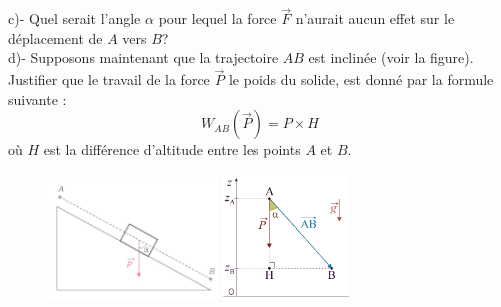 \documentclass[10pt]{beamer}
\begin{document}
\begin{frame}
\begin{block}{ }
c)- Quel serait l'angle $\alpha$ pour lequel la force $\overrightarrow{F}$ n'aurait aucun effet sur le déplacement de $A$ vers $B$? \\
d)- Supposons maintenant que la trajectoire $AB$ est inclinée (voir la figure). Justifier que le travail de la force $\overrightarrow{P}$ le poids du solide, est donné par la formule suivante :\\
\begin{equation*}
    W_{AB}(\overrightarrow{P}) = P\times H
\end{equation*} 
où $H$ est la différence d'altitude entre les points $A$ et $B$.
\end{block}
\begin{figure}[h]
\centering
\includegraphics[width=0.4\textwidth]{figure3.jpg}
\includegraphics[width=0.3\textwidth]{figure4.png}
\end{figure}
\end{frame}
\end{document}
